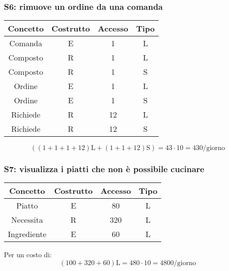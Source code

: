 \documentclass[a4paper,12pt]{report}
\begin{document}
\subsubsection{S6: rimuove un ordine da una comanda}
%
\begin{table}[H]
    \centering
    \begin{tabular}{|| c | c | c | c ||}
        \hline
        Concetto & Costrutto & Accesso & Tipo\\
        \hline
        Comanda & E & 1 & L\\
        \hline
        Composto & R & 1 & L\\
        \hline
        Composto & R & 1 & S\\
        \hline
        Ordine & E & 1 & L\\
        \hline
        Ordine & E & 1 & S\\
        \hline
        Richiede & R & 12 & L\\
        \hline
        Richiede & R & 12 & S\\
        \hline
    \end{tabular}
\end{table}
%
\begin{equation}
    ((1+1+1+12)\text{L} + (1+1+12)\text{S}) = 43 \cdot 10 = 430\text{/giorno}
\end{equation}
%
\subsubsection{S7: visualizza i piatti che non è possibile cucinare}
\begin{table}[H]
    \centering
    \begin{tabular}{|| c | c | c | c ||}
        \hline
        Concetto & Costrutto & Accesso & Tipo\\
        \hline
        Piatto & E & 80 & L\\
        \hline
        Necessita & R & 320 & L\\
        \hline
        Ingrediente & E & 60 & L\\
        \hline
    \end{tabular}
\end{table}
%
Per un costo di:
%
\begin{equation}
    (100 + 320 + 60) \text{L} = 480 \cdot 10 = 4800\text{/giorno}
\end{equation}
%
\end{document}
